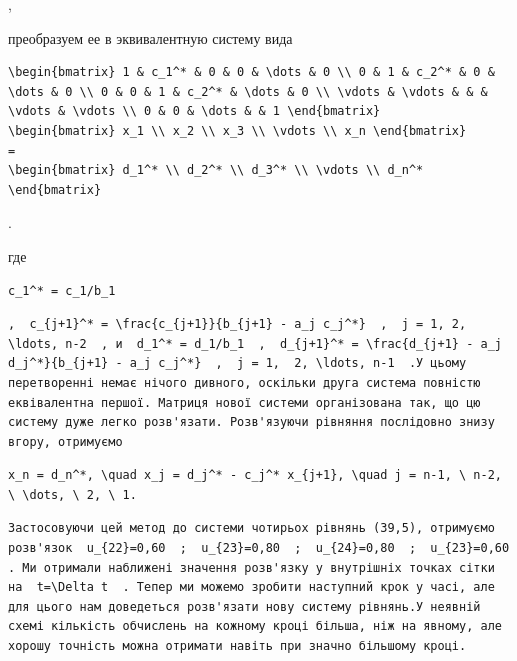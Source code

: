 \documentclass[
  ukrainian,
]{article}
\begin{document}
,

преобразуем ее в эквивалентную систему вида

\begin{verbatim}
\begin{bmatrix} 1 & c_1^* & 0 & 0 & \dots & 0 \\ 0 & 1 & c_2^* & 0 & \dots & 0 \\ 0 & 0 & 1 & c_2^* & \dots & 0 \\ \vdots & \vdots & & & \vdots & \vdots \\ 0 & 0 & \dots & & 1 \end{bmatrix}
\begin{bmatrix} x_1 \\ x_2 \\ x_3 \\ \vdots \\ x_n \end{bmatrix}
=
\begin{bmatrix} d_1^* \\ d_2^* \\ d_3^* \\ \vdots \\ d_n^* \end{bmatrix}
\end{verbatim}

.

где

\begin{verbatim}
c_1^* = c_1/b_1
\end{verbatim}

\begin{verbatim}
,  c_{j+1}^* = \frac{c_{j+1}}{b_{j+1} - a_j c_j^*}  ,  j = 1, 2, \ldots, n-2  , и  d_1^* = d_1/b_1  ,  d_{j+1}^* = \frac{d_{j+1} - a_j d_j^*}{b_{j+1} - a_j c_j^*}  ,  j = 1,  2, \ldots, n-1  .У цьому перетворенні немає нічого дивного, оскільки друга система повністю еквівалентна першої. Матриця нової системи організована так, що цю систему дуже легко розв'язати. Розв'язуючи рівняння послідовно знизу вгору, отримуємо
\end{verbatim}

\begin{verbatim}
x_n = d_n^*, \quad x_j = d_j^* - c_j^* x_{j+1}, \quad j = n-1, \ n-2, \ \dots, \ 2, \ 1.
\end{verbatim}

\begin{verbatim}
Застосовуючи цей метод до системи чотирьох рівнянь (39,5), отримуємо розв'язок  u_{22}=0,60  ;  u_{23}=0,80  ;  u_{24}=0,80  ;  u_{23}=0,60  . Ми отримали наближені значення розв'язку у внутрішніх точках сітки на  t=\Delta t  . Тепер ми можемо зробити наступний крок у часі, але для цього нам доведеться розв'язати нову систему рівнянь.У неявній схемі кількість обчислень на кожному кроці більша, ніж на явному, але хорошу точність можна отримати навіть при значно більшому кроці.
\end{verbatim}
\end{document}
